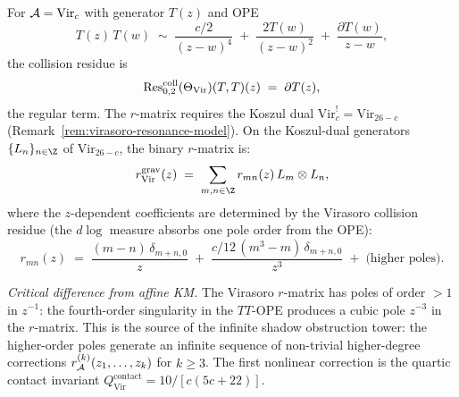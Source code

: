 \begin{computation}
\label{comp:thqg-V-virasoro-r}
For $\mathcal{A} = \mathrm{Vir}_c$ with generator $T(z)$ and OPE
\[
T(z)\,T(w)
\;\sim\;
\frac{c/2}{(z-w)^4}
\;+\;
\frac{2T(w)}{(z-w)^2}
\;+\;
\frac{\partial T(w)}{z-w},
\]
the collision residue is
\begin{equation}\label{eq:thqg-V-vir-collision}
\operatorname{Res}^{\mathrm{coll}}_{0,2}(\Theta_{\mathrm{Vir}})
 (T, T)(z)
\;=\;
\partial T(z),
\end{equation}
the regular term. The $r$-matrix requires the Koszul dual
$\mathrm{Vir}_c^! = \mathrm{Vir}_{26-c}$
(Remark~\ref{rem:virasoro-resonance-model}). On the Koszul-dual
generators $\{L_n\}_{n \in \Z}$ of $\mathrm{Vir}_{26-c}$, the
binary $r$-matrix is:
\begin{equation}\label{eq:thqg-V-vir-r}
\rgrav_{\mathrm{Vir}}(z)
\;=\;
\sum_{m,n \in \Z}
r_{mn}(z)\,
L_m \otimes L_n,
\end{equation}
where the $z$-dependent coefficients are
determined by the Virasoro collision residue
(the $d\log$ measure absorbs one pole order
from the OPE):
\begin{equation}\label{eq:thqg-V-vir-r-coefficients}
r_{mn}(z)
\;=\;
\frac{(m-n)\,\delta_{m+n,0}}{z}
\;+\;
\frac{c/12\,(m^3-m)\,\delta_{m+n,0}}{z^3}
\;+\;
\text{(higher poles)}.
\end{equation}

\emph{Critical difference from affine KM.}
The Virasoro $r$-matrix has poles of order $>1$ in $z^{-1}$: the
fourth-order singularity in the $TT$-OPE produces a cubic pole
$z^{-3}$ in the $r$-matrix. This is the source of the infinite
shadow obstruction tower: the higher-order poles generate an infinite sequence
of non-trivial higher-degree corrections
$r_{\mathcal{A}}^{(k)}(z_1,\dotsc,z_k)$ for $k \geq 3$.
The first nonlinear correction is the quartic contact invariant
$Q^{\mathrm{contact}}_{\mathrm{Vir}} = 10/[c(5c+22)]$.
\end{computation}

